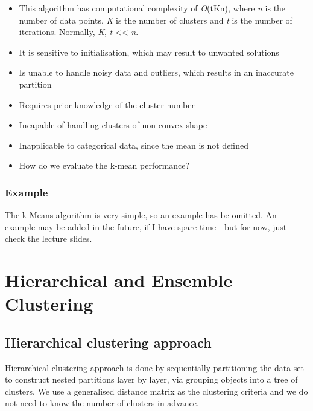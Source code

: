 \documentclass[11pt,fleqn]{book} %
\begin{document}
\begin{itemize}
	\item This algorithm has computational complexity of \textit{O}(tKn), where \textit{n} is the number of data points, \textit{K} is the number of clusters and \textit{t} is the number of iterations. Normally, \textit{K}, \textit{t} << \textit{n}.
	\item It is sensitive to initialisation, which may result to unwanted solutions
	\item Is unable to handle noisy data and outliers, which results in an inaccurate partition
	\item Requires prior knowledge of the cluster number
	\item Incapable of handling clusters of non-convex shape
	\item Inapplicable to categorical data, since the mean is not defined
	\item How do we evaluate the k-mean performance? 
\end{itemize}

\subsection*{Example}
The k-Means algorithm is very simple, so an example has be omitted. An example may be added in the future, if I have spare time - but for now, just check the lecture slides.



\chapter{Hierarchical and Ensemble Clustering}

\section{Hierarchical clustering approach}
Hierarchical clustering approach is done by sequentially partitioning the data set to construct nested partitions layer by layer, via grouping objects into a tree of clusters. We use a generalised distance matrix as the clustering criteria and we do not need to know the number of clusters in advance.
\end{document}
